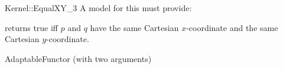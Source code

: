 \begin{ccRefFunctionObjectConcept}{Kernel::EqualXY_3}
A model for this must provide:


{returns true iff $p$ and $q$ have the same Cartesian $x$-coordinate
and the same Cartesian $y$-coordinate.}

\ccRefines
AdaptableFunctor (with two arguments)

\ccSeeAlso
{}\\

\end{ccRefFunctionObjectConcept}
